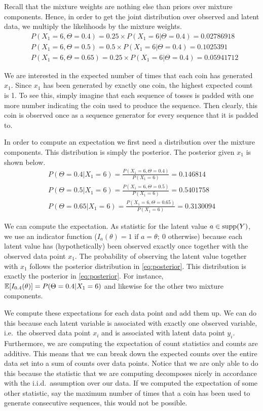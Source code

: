 Recall that the mixture weights are nothing else than priors over mixture components. Hence, in order to get the joint distribution over observed and
latent data, we multiply the likelihoods by the mixture weights.
\begin{align}
&P(X_{1}=6,\Theta=0.4) = 0.25 \times P(X_{1}=6|\Theta=0.4) = 0.02786918 \\
&P(X_{1}=6,\Theta=0.5) = 0.5 \times P(X_{1}=6|\Theta=0.4)  = 0.1025391 \nonumber \\ 
&P(X_{1}=6,\Theta=0.65) =  0.25 \times P(X_{1}=6|\Theta=0.4)  = 0.05941712 \nonumber
\end{align}

We are interested in the expected number of times that each coin has generated $ x_{1} $. Since $ x_{1} $ has been generated by exactly one coin,
the highest expected count is 1. To see this, simply imagine that each sequence of tosses is padded with one more number indicating the coin
used to produce the sequence. Then clearly, this coin is observed once as a sequence generator for every sequence that it is padded to.

In order to compute an expectation we first need a distribution over the mixture components. This distribution is simply the posterior. The
posterior given $ x_{1} $ is shown below.
\begin{align}\label{eq:posterior}
P(\Theta=0.4|X_{1}=6) = \frac{P(X_{1}=6,\Theta=0.4)}{P(X_1 = 6)} = 0.146814 \\
P(\Theta=0.5|X_{1}=6) = \frac{P(X_{1}=6,\Theta=0.5)}{P(X_1 = 6)} = 0.5401758 \nonumber \\
P(\Theta=0.65|X_{1}=6) = \frac{P(X_{1}=6,\Theta=0.65)}{P(X_1 = 6)} = 0.3130094 \nonumber
\end{align}

We can compute the expectation. As statistic for the latent value $a \in \operatorname{supp}(Y)$, we use an indicator function ($ I_{a}(\theta) = 1 \mbox{ if } a=\theta;~0 $ otherwise) 
because each latent value has (hypothetically) been observed exactly once
together with the observed data point $ x_{1} $. The probability of observing the latent value together with $ x_{1} $ follows the posterior distribution in \eqref{eq:posterior}. 
This distribution is exactly the posterior in \eqref{eq:posterior}. For instance, $ \mathbb{E}[I_{0.4}(\theta)] = P(\Theta=0.4|X_{1}=6) $ and likewise for the
other two mixture components.

We compute these expectations for each data point and add them up. We can do this because each latent 
variable is associated with exactly one observed variable, i.e.\ the observed data point $ x_{i} $ and
is associated with latent data point $ y_{i} $. Furthermore, we are computing the expectation of count
statistics and counts are additive. This means that we can break down the expected counts over the
entire data set into a sum of counts over data points. Notice that we are only able to do this because
the statistic that we are computing decomposes nicely in accordance with the i.i.d.\ assumption over
our data. If we computed the expectation of some other statistic, say the maximum number of times 
that a coin has been used to generate consecutive sequences, this would not be possible. 

